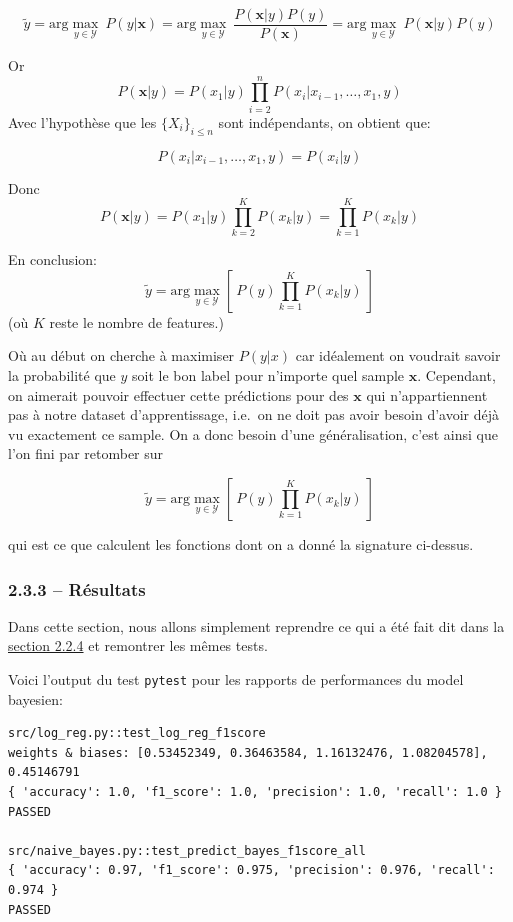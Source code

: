 \documentclass[
]{article}
\begin{document}
\[
\tilde{y}  = \text{arg}\max_{y \in \mathcal{Y}}\ P(y|\mathbf{x}) = \text{arg}\max_{y \in \mathcal{Y}}\ \frac{P(\mathbf{x}|y)  P(y)}{P(\mathbf{x})} =  \text{arg}\max_{y \in \mathcal{Y}}\ P(\mathbf{x}| y)P(y)
\]

Or \[ 
P(\mathbf{x}| y) = P(x_1 | y) \prod_{i = 2}^{n}{P(x_i | x_{i-1}, \ldots, x_1, y)}
\] Avec l'hypothèse que les \(\{X_i\}_{i \leq n}\) sont indépendants, on
obtient que:

\[P(x_i | x_{i-1}, \ldots, x_1, y) = P(x_i | y)\]

Donc
\[P(\mathbf{x}|y) = P(x_1 | y) \prod_{k = 2}^{K}{P(x_k | y)} = \prod_{k=1}^K{P(x_k | y)}\]

En conclusion:
\[ \tilde{y} = \text{arg}\max_{y \in \mathcal{Y}} \left[\  P(y) \prod_{k = 1}^K{P(x_k | y)}\  \right] \]
(où \(K\) reste le nombre de features.)

Où au début on cherche à maximiser \(P(y | x)\) car idéalement on
voudrait savoir la probabilité que \(y\) soit le bon label pour
n'importe quel sample \(\mathbf{x}\). Cependant, on aimerait pouvoir
effectuer cette prédictions pour des \(\mathbf{x}\) qui n'appartiennent
pas à notre dataset d'apprentissage, i.e.~on ne doit pas avoir besoin
d'avoir déjà vu exactement ce sample. On a donc besoin d'une
généralisation, c'est ainsi que l'on fini par retomber sur

\[ \tilde{y} = \text{arg}\max_{y \in \mathcal{Y}} \left[\  P(y) \prod_{k = 1}^K{P(x_k | y)}\  \right] \]

qui est ce que calculent les fonctions dont on a donné la signature
ci-dessus.

\subsubsection{2.3.3 -- Résultats}\label{ruxe9sultats-1}

Dans cette section, nous allons simplement reprendre ce qui a été fait
dit dans la \href{#ruxe9sultats}{section 2.2.4} et remontrer les mêmes
tests.

Voici l'output du test \texttt{pytest} pour les rapports de performances
du model bayesien:

\begin{lstlisting}
src/log_reg.py::test_log_reg_f1score 
weights & biases: [0.53452349, 0.36463584, 1.16132476, 1.08204578], 0.45146791  
{ 'accuracy': 1.0, 'f1_score': 1.0, 'precision': 1.0, 'recall': 1.0 }
PASSED

src/naive_bayes.py::test_predict_bayes_f1score_all  
{ 'accuracy': 0.97, 'f1_score': 0.975, 'precision': 0.976, 'recall': 0.974 }
PASSED
\end{lstlisting}
\end{document}
